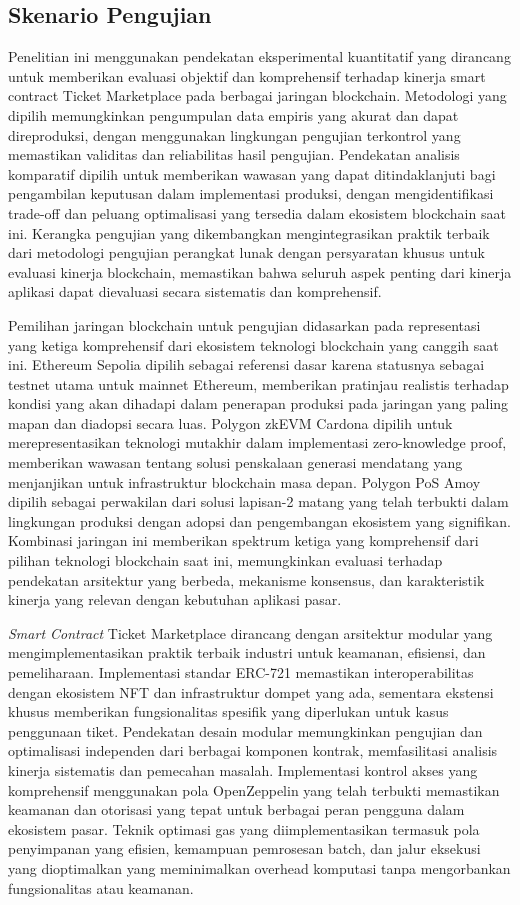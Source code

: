 \subsection{Skenario Pengujian}
Penelitian ini menggunakan pendekatan eksperimental kuantitatif yang dirancang
untuk memberikan evaluasi objektif dan komprehensif terhadap kinerja smart
contract Ticket Marketplace pada berbagai jaringan blockchain. Metodologi yang
dipilih memungkinkan pengumpulan data empiris yang akurat dan dapat
direproduksi, dengan menggunakan lingkungan pengujian terkontrol yang
memastikan validitas dan reliabilitas hasil pengujian. Pendekatan analisis
komparatif dipilih untuk memberikan wawasan yang dapat ditindaklanjuti bagi
pengambilan keputusan dalam implementasi produksi, dengan mengidentifikasi
trade-off dan peluang optimalisasi yang tersedia dalam ekosistem blockchain
saat ini. Kerangka pengujian yang dikembangkan mengintegrasikan praktik terbaik
dari metodologi pengujian perangkat lunak dengan persyaratan khusus untuk
evaluasi kinerja blockchain, memastikan bahwa seluruh aspek penting dari
kinerja aplikasi dapat dievaluasi secara sistematis dan komprehensif.

Pemilihan jaringan blockchain untuk pengujian didasarkan pada representasi yang
ketiga komprehensif dari ekosistem teknologi blockchain yang canggih saat ini.
Ethereum Sepolia dipilih sebagai referensi dasar karena statusnya sebagai
testnet utama untuk mainnet Ethereum, memberikan pratinjau realistis terhadap
kondisi yang akan dihadapi dalam penerapan produksi pada jaringan yang paling
mapan dan diadopsi secara luas. Polygon zkEVM Cardona dipilih untuk
merepresentasikan teknologi mutakhir dalam implementasi zero-knowledge proof,
memberikan wawasan tentang solusi penskalaan generasi mendatang yang
menjanjikan untuk infrastruktur blockchain masa depan. Polygon PoS Amoy dipilih
sebagai perwakilan dari solusi lapisan-2 matang yang telah terbukti dalam
lingkungan produksi dengan adopsi dan pengembangan ekosistem yang signifikan.
Kombinasi jaringan ini memberikan spektrum ketiga yang komprehensif dari
pilihan teknologi blockchain saat ini, memungkinkan evaluasi terhadap
pendekatan arsitektur yang berbeda, mekanisme konsensus, dan karakteristik
kinerja yang relevan dengan kebutuhan aplikasi pasar.

\emph{Smart Contract} Ticket Marketplace dirancang dengan arsitektur modular yang
mengimplementasikan praktik terbaik industri untuk keamanan, efisiensi, dan
pemeliharaan. Implementasi standar ERC-721 memastikan interoperabilitas dengan
ekosistem NFT dan infrastruktur dompet yang ada, sementara ekstensi khusus
memberikan fungsionalitas spesifik yang diperlukan untuk kasus penggunaan
tiket. Pendekatan desain modular memungkinkan pengujian dan optimalisasi
independen dari berbagai komponen kontrak, memfasilitasi analisis kinerja
sistematis dan pemecahan masalah. Implementasi kontrol akses yang komprehensif
menggunakan pola OpenZeppelin yang telah terbukti memastikan keamanan dan
otorisasi yang tepat untuk berbagai peran pengguna dalam ekosistem pasar.
Teknik optimasi gas yang diimplementasikan termasuk pola penyimpanan yang
efisien, kemampuan pemrosesan batch, dan jalur eksekusi yang dioptimalkan yang
meminimalkan overhead komputasi tanpa mengorbankan fungsionalitas atau
keamanan.

